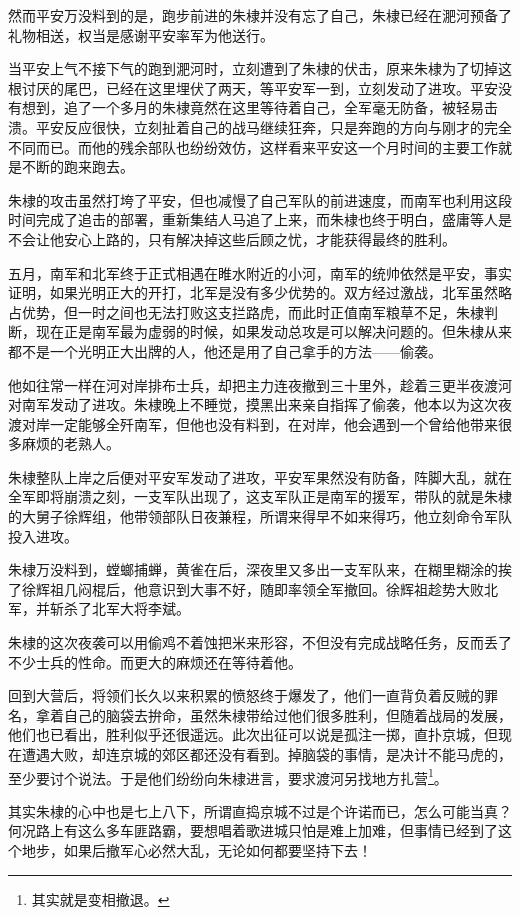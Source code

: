 \begin{multicols}{\theparacolNo}
		然而平安万没料到的是，跑步前进的朱棣并没有忘了自己，朱棣已经在淝河预备了礼物相送，权当是感谢平安率军为他送行。

		当平安上气不接下气的跑到淝河时，立刻遭到了朱棣的伏击，原来朱棣为了切掉这根讨厌的尾巴，已经在这里埋伏了两天，等平安军一到，立刻发动了进攻。平安没有想到，追了一个多月的朱棣竟然在这里等待着自己，全军毫无防备，被轻易击溃。平安反应很快，立刻扯着自己的战马继续狂奔，只是奔跑的方向与刚才的完全不同而已。而他的残余部队也纷纷效仿，这样看来平安这一个月时间的主要工作就是不断的跑来跑去。

		朱棣的攻击虽然打垮了平安，但也减慢了自己军队的前进速度，而南军也利用这段时间完成了追击的部署，重新集结人马追了上来，而朱棣也终于明白，盛庸等人是不会让他安心上路的，只有解决掉这些后顾之忧，才能获得最终的胜利。

		五月，南军和北军终于正式相遇在睢水附近的小河，南军的统帅依然是平安，事实证明，如果光明正大的开打，北军是没有多少优势的。双方经过激战，北军虽然略占优势，但一时之间也无法打败这支拦路虎，而此时正值南军粮草不足，朱棣判断，现在正是南军最为虚弱的时候，如果发动总攻是可以解决问题的。但朱棣从来都不是一个光明正大出牌的人，他还是用了自己拿手的方法——偷袭。

		他如往常一样在河对岸排布士兵，却把主力连夜撤到三十里外，趁着三更半夜渡河对南军发动了进攻。朱棣晚上不睡觉，摸黑出来亲自指挥了偷袭，他本以为这次夜渡对岸一定能够全歼南军，但他也没有料到，在对岸，他会遇到一个曾给他带来很多麻烦的老熟人。

		朱棣整队上岸之后便对平安军发动了进攻，平安军果然没有防备，阵脚大乱，就在全军即将崩溃之刻，一支军队出现了，这支军队正是南军的援军，带队的就是朱棣的大舅子徐辉组，他带领部队日夜兼程，所谓来得早不如来得巧，他立刻命令军队投入进攻。

		朱棣万没料到，螳螂捕蝉，黄雀在后，深夜里又多出一支军队来，在糊里糊涂的挨了徐辉祖几闷棍后，他意识到大事不好，随即率领全军撤回。徐辉祖趁势大败北军，并斩杀了北军大将李斌。

		朱棣的这次夜袭可以用偷鸡不着蚀把米来形容，不但没有完成战略任务，反而丢了不少士兵的性命。而更大的麻烦还在等待着他。

		回到大营后，将领们长久以来积累的愤怒终于爆发了，他们一直背负着反贼的罪名，拿着自己的脑袋去拚命，虽然朱棣带给过他们很多胜利，但随着战局的发展，他们也已看出，胜利似乎还很遥远。此次出征可以说是孤注一掷，直扑京城，但现在遭遇大败，却连京城的郊区都还没有看到。掉脑袋的事情，是决计不能马虎的，至少要讨个说法。于是他们纷纷向朱棣进言，要求渡河另找地方扎营\footnote{其实就是变相撤退。}。

		其实朱棣的心中也是七上八下，所谓直捣京城不过是个许诺而已，怎么可能当真？何况路上有这么多车匪路霸，要想唱着歌进城只怕是难上加难，但事情已经到了这个地步，如果后撤军心必然大乱，无论如何都要坚持下去！


\end{multicols}
